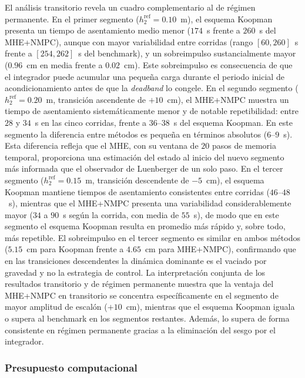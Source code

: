 \documentclass[12pt,letterpaper]{article}
\begin{document}
El análisis transitorio revela un cuadro complementario 
al de régimen permanente. En el primer segmento 
($h_2^{\mathrm{ref}} = 0.10$~m), el esquema Koopman 
presenta un tiempo de asentamiento medio menor ($174$~s 
frente a $260$~s del MHE+NMPC), aunque con mayor 
variabilidad entre corridas (rango $[60, 260]$~s frente a 
$[254, 262]$~s del benchmark), y un sobreimpulso 
sustancialmente mayor ($0.96$~cm en media frente a 
$0.02$~cm). Este sobreimpulso es consecuencia de que el integrador puede 
acumular una pequeña carga durante el periodo inicial de 
acondicionamiento antes de que la \textit{deadband} lo 
congele. En el segundo segmento 
($h_2^{\mathrm{ref}} = 0.20$~m, transición ascendente 
de $+10$~cm), el MHE+NMPC muestra un tiempo de 
asentamiento sistemáticamente menor y de notable 
repetibilidad: entre $28$ y $34$~s en las cinco corridas, 
frente a $36$--$38$~s del esquema Koopman. En este
segmento la diferencia entre métodos es pequeña en 
términos absolutos ($6$--$9$~s). Esta diferencia refleja 
que el MHE, con su ventana de $20$ pasos de memoria 
temporal, proporciona una estimación del estado al inicio 
del nuevo segmento más informada que el observador de 
Luenberger de un solo paso. En el tercer segmento 
($h_2^{\mathrm{ref}} = 0.15$~m, transición descendente 
de $-5$~cm), el esquema Koopman mantiene tiempos de 
asentamiento consistentes entre corridas ($46$--$48$~s), 
mientras que el MHE+NMPC presenta una variabilidad 
considerablemente mayor ($34$ a $90$~s según la corrida, 
con media de $55$~s), de modo que en este segmento el 
esquema Koopman resulta en promedio más rápido y, sobre 
todo, más repetible. El sobreimpulso en el tercer segmento 
es similar en ambos métodos ($5.15$~cm para Koopman frente 
a $4.65$~cm para MHE+NMPC), confirmando que en las 
transiciones descendentes la dinámica dominante es el 
vaciado por gravedad y no la estrategia de control. La 
interpretación conjunta de los resultados transitorio y de 
régimen permanente muestra que la ventaja del MHE+NMPC en 
transitorio se concentra específicamente en el segmento de 
mayor amplitud de escalón ($+10$~cm), mientras que el 
esquema Koopman iguala o supera al benchmark en los
segmentos restantes. Además, lo supera de forma consistente en
régimen permanente gracias a la eliminación del sesgo por
el integrador.

\subsubsection{Presupuesto computacional}
\label{sec:computo}
\end{document}

